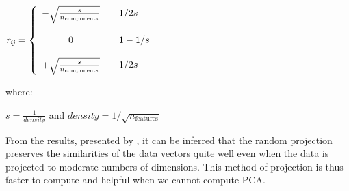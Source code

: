 \begin{center}
	$\mathit{r_{ij}} = \left\{ \begin{array}{c c l} -\sqrt{\frac{s}{n_{\text{components}}}} & & 1 / 2s\\\\ 0  && 1 - 1 / s \\\\ +\sqrt{\frac{s}{n_{\text{components}}}} & & 1 / 2s\\ \end{array} \right.$
\end{center}
where:
\begin{center}
	$\mathit{s} =\frac{1}{density}$ and 
	$\mathit{density} = 1 / \sqrt{n_{\text{features}}}$
\end{center}
From the results, presented by \cite{bingham2001random}, it can be inferred that the random projection preserves the similarities of the data vectors quite well even when the data is projected to moderate numbers of dimensions. This method of projection is thus faster to compute and helpful when we cannot compute PCA. 
